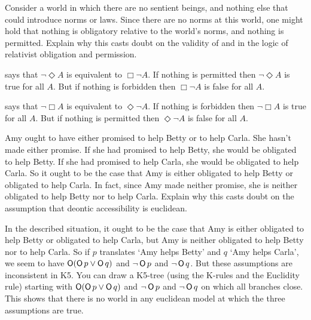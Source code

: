 \begin{exercise}
  Consider a world in which there are no sentient beings, and nothing else that
  could introduce norms or laws. Since there are no norms at this world, one
  might hold that nothing is obligatory relative to the world's norms, and
  nothing is permitted. Explain why this casts doubt on the validity of
   and  in the logic of relativist obligation and
  permission.
\end{exercise}
\begin{solution}
   says that $\neg \Diamond A$ is equivalent to $\Box \neg A$. If
  nothing is permitted then $\neg \Diamond A$ is true for all $A$. But if
  nothing is forbidden then $\Box \neg A$ is false for all $A$.

   says that $\neg \Box A$ is equivalent to $\Diamond \neg A$. If
  nothing is forbidden then $\neg \Box A$ is true for all $A$. But if
  nothing is permitted then $\Diamond \neg A$ is false for all $A$.
\end{solution}

\begin{exercise}\label{ex:amybettycarla}
  Amy ought to have either promised to help Betty or to help Carla. She hasn't
  made either promise. If she had promised to help Betty, she would be obligated
  to help Betty. If she had promised to help Carla, she would be obligated to
  help Carla. So it ought to be the case that Amy is either obligated to help
  Betty or obligated to help Carla. In fact, since Amy made neither promise, she
  is neither obligated to help Betty nor to help Carla. Explain why this casts
  doubt on the assumption that deontic accessibility is euclidean.
\end{exercise}
\begin{solution}
  In the described situation, it ought to be the case that Amy is either
  obligated to help Betty or obligated to help Carla, but Amy is neither
  obligated to help Betty nor to help Carla. So if $p$ translates `Amy helps
  Betty' and $q$ `Amy helps Carla', we seem to have $\operatorname{\mathsf{O}}(\operatorname{\mathsf{O}} p \lor \operatorname{\mathsf{O}} q)$ and
  $\neg \operatorname{\mathsf{O}} p$ and $\neg \operatorname{\mathsf{O}} q$. But these assumptions are inconsistent in K5.
  You can draw a K5-tree (using the K-rules and the Euclidity rule) starting
  with $\operatorname{\mathsf{O}}(\operatorname{\mathsf{O}} p \lor \operatorname{\mathsf{O}} q)$ and $\neg \operatorname{\mathsf{O}} p$ and $\neg \operatorname{\mathsf{O}} q$ on which all
  branches close. This shows that there is no world in any euclidean model at
  which the three assumptions are true.
\end{solution}

